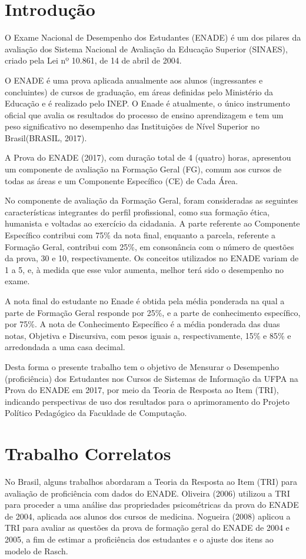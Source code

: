 \documentclass[12pt]{article}
\begin{document}
\newpage
\section{Introdução}

O Exame Nacional de Desempenho dos Estudantes (ENADE) é um dos pilares da avaliação dos Sistema Nacional de Avaliação da Educação Superior (SINAES), criado pela Lei nº 10.861, de 14 de abril de 2004. 

O ENADE é uma prova aplicada anualmente aos alunos (ingressantes e concluintes) de cursos de graduação, em áreas definidas pelo Ministério da Educação e é realizado pelo INEP. O Enade é atualmente, o único instrumento oficial que avalia os resultados do processo de ensino aprendizagem e tem um peso significativo no desempenho das Instituições de Nível Superior no Brasil(BRASIL, 2017).

A Prova do ENADE (2017), com duração total de 4 (quatro) horas, apresentou um componente de avaliação na Formação Geral (FG), comum aos cursos de todas as áreas e um Componente Específico (CE) de Cada Área. 

No componente de avaliação da Formação Geral, foram consideradas as seguintes características integrantes do perfil profissional, como sua formação ética, humanista e voltadas ao exercício da cidadania. A parte referente ao Componente Específico contribui com 75\% da nota final, enquanto a parcela, referente a Formação Geral, contribui com 25\%, em consonância com o número de questões da prova, 30 e 10, respectivamente. Os conceitos utilizados no ENADE variam de 1 a 5, e, à medida que esse valor aumenta, melhor terá sido o desempenho no exame.

A nota final do estudante no Enade é obtida pela média ponderada na qual a parte de Formação Geral responde por 25\%, e a parte de conhecimento específico, por 75\%. A nota de Conhecimento Específico é a média ponderada das duas notas, Objetiva e Discursiva, com pesos iguais a, respectivamente, 15\% e 85\% e arredondada a uma casa decimal.

Desta forma o presente trabalho tem o objetivo de Mensurar o Desempenho (proficiência) dos Estudantes nos Cursos de Sistemas de Informação da UFPA na Prova do ENADE em 2017, por meio da Teoria de Resposta ao Item (TRI), indicando perspectivas de uso dos resultados para o aprimoramento do Projeto Político Pedagógico da Faculdade de Computação.


\section{Trabalho Correlatos} \label{sec:firstpage}
No Brasil, alguns trabalhos abordaram a Teoria da Resposta ao Item (TRI) para avaliação de proficiência com dados do ENADE. Oliveira (2006) utilizou a TRI para proceder a uma análise das propriedades psicométricas da prova do ENADE de 2004, aplicada aos alunos dos cursos de medicina. Nogueira (2008) aplicou a TRI para avaliar as questões da prova de formação geral do ENADE de 2004 e 2005, a fim de estimar a proficiência dos estudantes e o ajuste dos itens ao modelo de Rasch.
\end{document}

